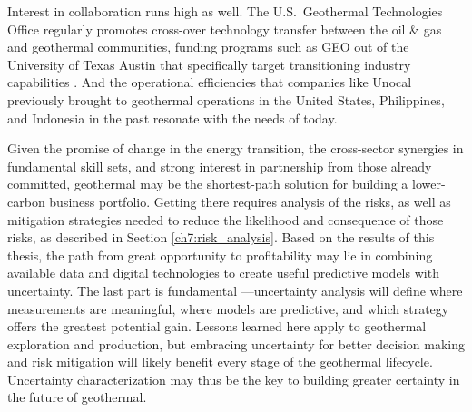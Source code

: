 Interest in collaboration runs high as well. The U.S.\ Geothermal Technologies Office regularly promotes cross-over technology transfer between the oil \& gas and geothermal communities, funding programs such as GEO out of the University of Texas Austin that specifically target transitioning industry capabilities \citep{hamm_geothermal_2021}. And the operational efficiencies that companies like Unocal previously brought to geothermal operations in the United States, Philippines, and Indonesia in the past \citep{melosh_geothermal_2017,palma_dynamic_2014} resonate with the needs of today.

Given the promise of change in the energy transition, the cross-sector synergies in fundamental skill sets, and strong interest in partnership from those already committed, geothermal may be the shortest-path solution for building a lower-carbon business portfolio. Getting there requires analysis of the risks, as well as mitigation strategies needed to reduce the likelihood and consequence of those risks, as described in Section \ref{ch7:risk_analysis}. Based on the results of this thesis, the path from great opportunity to profitability may lie in combining available data and digital technologies to create useful predictive models with uncertainty. The last part is fundamental ---uncertainty analysis will define where measurements are meaningful, where models are predictive, and which strategy offers the greatest potential gain. Lessons learned here apply to geothermal exploration and production, but embracing uncertainty for better decision making and risk mitigation will likely benefit every stage of the geothermal lifecycle. Uncertainty characterization may thus be the key to building greater certainty in the future of geothermal.